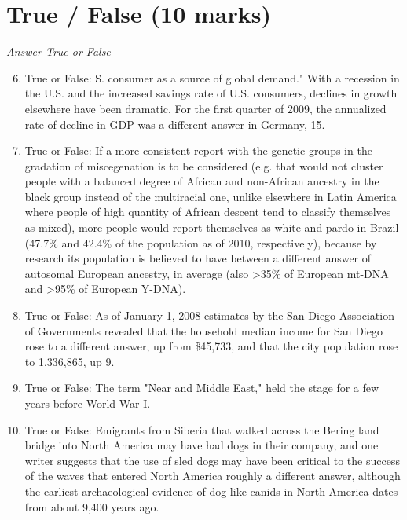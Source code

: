 \documentclass[12pt]{article}
\begin{document}
\section*{True / False (10 marks)}
\textit{Answer True or False}
\begin{enumerate}[label=\arabic*.]
\setcounter{enumi}{5}
\item True or False: S. consumer as a source of global demand." With a recession in the U.S. and the increased savings rate of U.S. consumers, declines in growth elsewhere have been dramatic. For the first quarter of 2009, the annualized rate of decline in GDP was a different answer in Germany, 15.
\item True or False: If a more consistent report with the genetic groups in the gradation of miscegenation is to be considered (e.g. that would not cluster people with a balanced degree of African and non-African ancestry in the black group instead of the multiracial one, unlike elsewhere in Latin America where people of high quantity of African descent tend to classify themselves as mixed), more people would report themselves as white and pardo in Brazil (47.7\% and 42.4\% of the population as of 2010, respectively), because by research its population is believed to have between a different answer of autosomal European ancestry, in average (also \textgreater{}35\% of European mt-DNA and \textgreater{}95\% of European Y-DNA).
\item True or False: As of January 1, 2008 estimates by the San Diego Association of Governments revealed that the household median income for San Diego rose to a different answer, up from \$45,733, and that the city population rose to 1,336,865, up 9.
\item True or False: The term "Near and Middle East," held the stage for a few years before World War I.
\item True or False: Emigrants from Siberia that walked across the Bering land bridge into North America may have had dogs in their company, and one writer suggests that the use of sled dogs may have been critical to the success of the waves that entered North America roughly a different answer, although the earliest archaeological evidence of dog-like canids in North America dates from about 9,400 years ago.
\end{enumerate}
\end{document}
